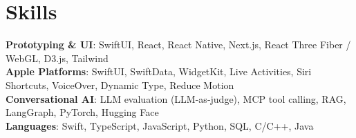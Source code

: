 \def\COURSEWORK{Human-Centered Interfaces, Artificial Intelligence, Machine Learning, Data Structures, Algorithms}
\def\ACTIVITIES{Full-Stack Development Head TA (100+ students), Notion Campus Leader, Society of Women Engineers}



\section{Skills}
 \begin{itemize}[leftmargin=0.15in, label={}]
    \small{\item{
     \textbf{Prototyping \& UI}{: SwiftUI, React, React Native, Next.js, React Three Fiber / WebGL, D3.js, Tailwind} \\
     \textbf{Apple Platforms}{: SwiftUI, SwiftData, WidgetKit, Live Activities, Siri Shortcuts, VoiceOver, Dynamic Type, Reduce Motion} \\
     \textbf{Conversational AI}{: LLM evaluation (LLM-as-judge), MCP tool calling, RAG, LangGraph, PyTorch, Hugging Face} \\
     \textbf{Languages}{: Swift, TypeScript, JavaScript, Python, SQL, C/C++, Java}
    }}
 \end{itemize}

